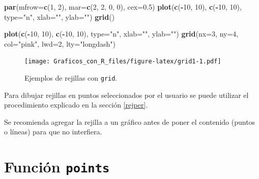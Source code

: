 \documentclass[10pt,]{krantz}
\makeatletter
\newenvironment{Shaded}{\begin{snugshade}}{\end{snugshade}}
\newcommand{\KeywordTok}[1]{\textcolor[rgb]{0.13,0.29,0.53}{\textbf{#1}}}
\newcommand{\DataTypeTok}[1]{\textcolor[rgb]{0.13,0.29,0.53}{#1}}
\newcommand{\DecValTok}[1]{\textcolor[rgb]{0.00,0.00,0.81}{#1}}
\newcommand{\FloatTok}[1]{\textcolor[rgb]{0.00,0.00,0.81}{#1}}
\newcommand{\StringTok}[1]{\textcolor[rgb]{0.31,0.60,0.02}{#1}}
\newcommand{\OperatorTok}[1]{\textcolor[rgb]{0.81,0.36,0.00}{\textbf{#1}}}
\newcommand{\NormalTok}[1]{#1}
\newenvironment{kframe}{%
\medskip{}
\setlength{\fboxsep}{.8em}
 \def\at@end@of@kframe{}%
 \ifinner\ifhmode%
  \def\at@end@of@kframe{\end{minipage}}%
  \begin{minipage}{\columnwidth}%
 \fi\fi%
 \def\FrameCommand##1{\hskip\@totalleftmargin \hskip-\fboxsep
 \colorbox{shadecolor}{##1}\hskip-\fboxsep
     \hskip-\linewidth \hskip-\@totalleftmargin \hskip\columnwidth}%
 \MakeFramed {\advance\hsize-\width
   \@totalleftmargin\z@ \linewidth\hsize
   \@setminipage}}%
 {\par\unskip\endMakeFramed%
 \at@end@of@kframe}
\renewenvironment{Shaded}{\begin{kframe}}{\end{kframe}}
\let\BeginKnitrBlock\begin \let\EndKnitrBlock\end
\makeatother
\begin{document}
\begin{Shaded}
\begin{Highlighting}[]
\KeywordTok{par}\NormalTok{(}\DataTypeTok{mfrow=}\KeywordTok{c}\NormalTok{(}\DecValTok{1}\NormalTok{, }\DecValTok{2}\NormalTok{), }\DataTypeTok{mar=}\KeywordTok{c}\NormalTok{(}\DecValTok{2}\NormalTok{, }\DecValTok{2}\NormalTok{, }\DecValTok{0}\NormalTok{, }\DecValTok{0}\NormalTok{), }\DataTypeTok{cex=}\FloatTok{0.5}\NormalTok{)}
\KeywordTok{plot}\NormalTok{(}\KeywordTok{c}\NormalTok{(}\OperatorTok{-}\DecValTok{10}\NormalTok{, }\DecValTok{10}\NormalTok{), }\KeywordTok{c}\NormalTok{(}\OperatorTok{-}\DecValTok{10}\NormalTok{, }\DecValTok{10}\NormalTok{), }\DataTypeTok{type=}\StringTok{"n"}\NormalTok{, }\DataTypeTok{xlab=}\StringTok{""}\NormalTok{, }\DataTypeTok{ylab=}\StringTok{""}\NormalTok{)}
\KeywordTok{grid}\NormalTok{()}

\KeywordTok{plot}\NormalTok{(}\KeywordTok{c}\NormalTok{(}\OperatorTok{-}\DecValTok{10}\NormalTok{, }\DecValTok{10}\NormalTok{), }\KeywordTok{c}\NormalTok{(}\OperatorTok{-}\DecValTok{10}\NormalTok{, }\DecValTok{10}\NormalTok{), }\DataTypeTok{type=}\StringTok{"n"}\NormalTok{, }\DataTypeTok{xlab=}\StringTok{""}\NormalTok{, }\DataTypeTok{ylab=}\StringTok{""}\NormalTok{)}
\KeywordTok{grid}\NormalTok{(}\DataTypeTok{nx=}\DecValTok{3}\NormalTok{, }\DataTypeTok{ny=}\DecValTok{4}\NormalTok{, }\DataTypeTok{col=}\StringTok{"pink"}\NormalTok{, }\DataTypeTok{lwd=}\DecValTok{2}\NormalTok{, }\DataTypeTok{lty=}\StringTok{"longdash"}\NormalTok{)}
\end{Highlighting}
\end{Shaded}

\begin{figure}
\centering
\texttt{[image: Graficos\_con\_R\_files/figure-latex/grid1-1.pdf]}
\caption{\label{fig:grid1}Ejemplos de rejillas con \texttt{grid}.}
\end{figure}

\BeginKnitrBlock{rmdtip}
Para dibujar rejillas en puntos seleccionados por el usuario se puede
utilizar el procedimiento explicado en la sección \ref{rejper}.
\EndKnitrBlock{rmdtip}

\BeginKnitrBlock{rmdwarning}
Se recomienda agregar la rejilla a un gráfico antes de poner el
contenido (puntos o líneas) para que no interfiera.
\EndKnitrBlock{rmdwarning}

\section{\texorpdfstring{Función \texttt{points} 
}{Función points  }}\label{funcion-points}
\end{document}
